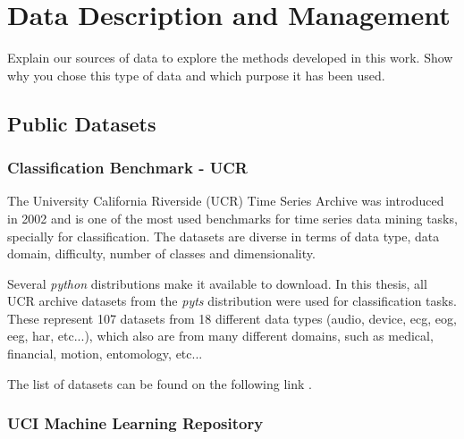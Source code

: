 
%

\chapter{Data Description and Management}
\label{cha:data}

Explain our sources of data to explore the methods developed in this work. Show why you chose this type of data and which purpose it has been used. 


\section{Public Datasets}

\subsection{Classification Benchmark - UCR}

The University California Riverside (UCR) Time Series Archive was introduced in 2002 
and is one of the most used benchmarks for time series data mining tasks, specially for classification.  The datasets are diverse in terms of data type, data domain, difficulty, number of classes and dimensionality\cite{ucr}.
\par
Several \textit{python} distributions make it available to download. In this thesis, all UCR archive datasets from the \textit{pyts} distribution were used for classification tasks. These represent 107 datasets from 18 different data types (\gls{audio}, \gls{device}, \gls{ecg}, \gls{eog}, \gls{eeg}, \gls{har}, etc...), which also are from many different domains, such as medical, financial, motion, entomology, etc...\cite{ucr}
\par
The list of datasets can be found on the following link \cite{ucr_site}.
 

\subsection{UCI Machine Learning Repository}

